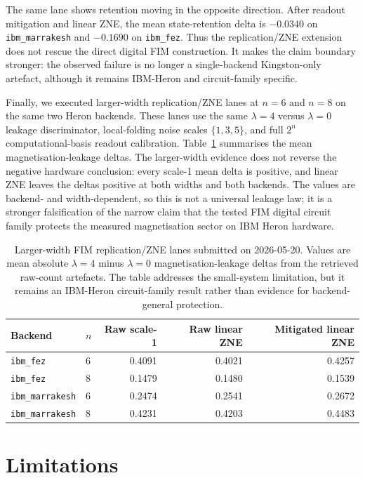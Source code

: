 \documentclass[preprint,aps,physrev,superscriptaddress,floatfix,longbibliography]{revtex4-2}
\begin{document}
The same lane shows retention moving in the opposite direction. After
readout mitigation and linear ZNE, the mean state-retention delta is
$-0.0340$ on \texttt{ibm\_marrakesh} and $-0.1690$ on
\texttt{ibm\_fez}. Thus the replication/ZNE extension does not rescue the
direct digital FIM construction. It makes the claim boundary stronger:
the observed failure is no longer a single-backend Kingston-only artefact,
although it remains IBM-Heron and circuit-family specific.

Finally, we executed larger-width replication/ZNE lanes at $n=6$ and $n=8$ on
the same two Heron backends. These lanes use the same $\lambda=4$ versus
$\lambda=0$ leakage discriminator, local-folding noise scales $\{1,3,5\}$, and
full $2^n$ computational-basis readout calibration. Table~\ref{tab:largerfim}
summarises the mean magnetisation-leakage deltas. The larger-width evidence
does not reverse the negative hardware conclusion: every scale-1 mean delta is
positive, and linear ZNE leaves the deltas positive at both widths and both
backends. The values are backend- and width-dependent, so this is not a
universal leakage law; it is a stronger falsification of the narrow claim that
the tested FIM digital circuit family protects the measured magnetisation
sector on IBM Heron hardware.

\begin{table}[tb]
\centering
\small
\begin{tabular}{llrrr}
\toprule
Backend & $n$ & Raw scale-1 & Raw linear ZNE & Mitigated linear ZNE \\
\midrule
\texttt{ibm\_fez} & 6 & 0.4091 & 0.4021 & 0.4257 \\
\texttt{ibm\_fez} & 8 & 0.1479 & 0.1480 & 0.1539 \\
\texttt{ibm\_marrakesh} & 6 & 0.2474 & 0.2541 & 0.2672 \\
\texttt{ibm\_marrakesh} & 8 & 0.4231 & 0.4203 & 0.4483 \\
\bottomrule
\end{tabular}
\caption{Larger-width FIM replication/ZNE lanes submitted on 2026-05-20.
Values are mean absolute $\lambda=4$ minus $\lambda=0$ magnetisation-leakage
deltas from the retrieved raw-count artefacts. The table addresses the
small-system limitation, but it remains an IBM-Heron circuit-family result
rather than evidence for backend-general protection.}
\label{tab:largerfim}
\end{table}

\section{Limitations}
\end{document}
